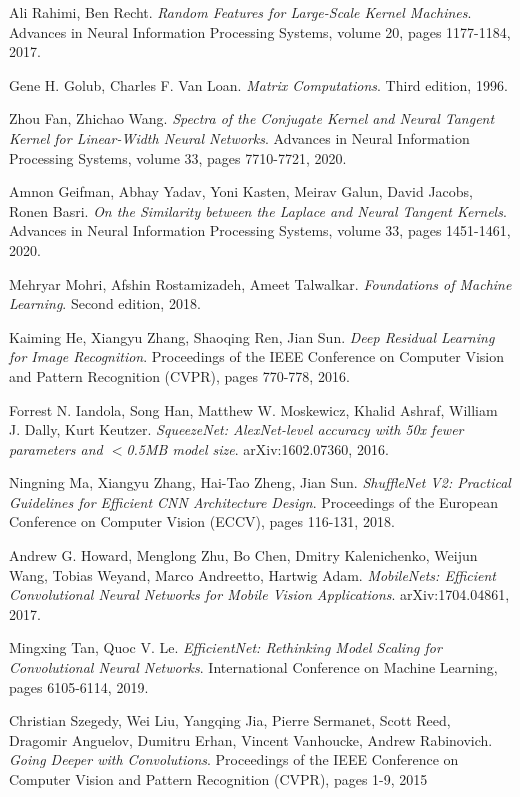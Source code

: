 \documentclass[11pt, a4paper]{article}
\begin{document}
\begin{thebibliography}{999}
 Ali Rahimi, Ben Recht. \textit{Random Features for Large-Scale Kernel Machines}. Advances in Neural Information Processing Systems, volume 20, pages 1177-1184, 2017.

 Gene H. Golub, Charles F. Van Loan. \textit{Matrix Computations}. Third edition, 1996.

 Zhou Fan, Zhichao Wang. \textit{Spectra of the Conjugate Kernel and Neural Tangent Kernel for Linear-Width Neural Networks}. Advances in Neural Information Processing Systems, volume 33, pages 7710-7721, 2020.

 Amnon Geifman, Abhay Yadav, Yoni Kasten, Meirav Galun, David Jacobs, Ronen Basri. \textit{On the Similarity between the Laplace and Neural Tangent Kernels}. Advances in Neural Information Processing Systems, volume 33,  pages 1451-1461, 2020.

 Mehryar Mohri, Afshin Rostamizadeh, Ameet Talwalkar. \textit{Foundations of Machine Learning}. Second edition, 2018.

 Kaiming He, Xiangyu Zhang, Shaoqing Ren, Jian Sun. \textit{Deep Residual Learning for Image Recognition}. Proceedings of the IEEE Conference on Computer Vision and Pattern Recognition (CVPR), pages 770-778, 2016.

 Forrest N. Iandola, Song Han, Matthew W. Moskewicz, Khalid Ashraf, William J. Dally, Kurt Keutzer. \textit{SqueezeNet: AlexNet-level accuracy with 50x fewer parameters and $<$0.5MB model size}. arXiv:1602.07360, 2016.

 Ningning Ma, Xiangyu Zhang, Hai-Tao Zheng, Jian Sun. \textit{ShuffleNet V2: Practical Guidelines for Efficient CNN Architecture Design}. Proceedings of the European Conference on Computer Vision (ECCV), pages 116-131, 2018.

 Andrew G. Howard, Menglong Zhu, Bo Chen, Dmitry Kalenichenko, Weijun Wang, Tobias Weyand, Marco Andreetto, Hartwig Adam. \textit{MobileNets: Efficient Convolutional Neural Networks for Mobile Vision Applications}. arXiv:1704.04861, 2017.

 Mingxing Tan, Quoc V. Le. \textit{EfficientNet: Rethinking Model Scaling for Convolutional Neural Networks}. International Conference on Machine Learning, pages 6105-6114, 2019.

 Christian Szegedy, Wei Liu, Yangqing Jia, Pierre Sermanet, Scott Reed, Dragomir Anguelov, Dumitru Erhan, Vincent Vanhoucke, Andrew Rabinovich. \textit{Going Deeper with Convolutions}. Proceedings of the IEEE Conference on Computer Vision and Pattern Recognition (CVPR), pages 1-9, 2015


\end{thebibliography}
\end{document}
